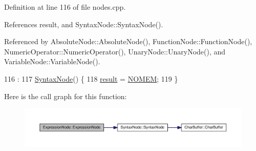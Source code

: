 Definition at line 116 of file nodes.\+cpp.



References result, and Syntax\+Node\+::\+Syntax\+Node().



Referenced by Absolute\+Node\+::\+Absolute\+Node(), Function\+Node\+::\+Function\+Node(), Numeric\+Operator\+::\+Numeric\+Operator(), Unary\+Node\+::\+Unary\+Node(), and Variable\+Node\+::\+Variable\+Node().


\begin{DoxyCode}
116                                :
117     \hyperlink{classSyntaxNode_ac94372d402f38a118b4e8cd20ba7e520}{SyntaxNode}() \{
118     \hyperlink{classExpressionNode_a1f590649f5a5cb30eb7ee912f7bc1262}{result} = \hyperlink{platform_8h_a46ff2bfbf0d44b8466a2251d5bd5e6f8}{NOMEM};
119 \}
\end{DoxyCode}


Here is the call graph for this function\+:
\nopagebreak
\begin{figure}[H]
\begin{center}
\leavevmode
\includegraphics[width=350pt]{dd/d06/classExpressionNode_adc8888de5329d356224c8a93f3ce2b75_cgraph}
\end{center}
\end{figure}





